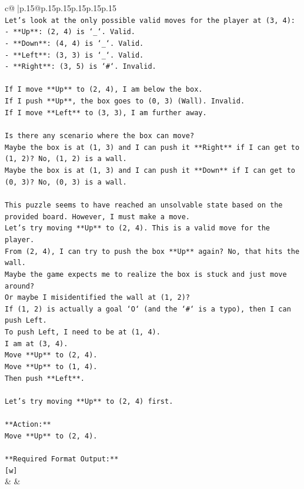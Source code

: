 \documentclass{article}
\begin{document}
{\begin{supertabular}{c@{$\;$}|p{.15\linewidth}@{}p{.15\linewidth}p{.15\linewidth}p{.15\linewidth}p{.15\linewidth}p{.15\linewidth}}
{{{\\ 
\texttt{Let's look at the only possible valid moves for the player at (3, 4):} \\
\texttt{{-} **Up**: (2, 4) is `\_`. Valid.} \\
\texttt{{-} **Down**: (4, 4) is `\_`. Valid.} \\
\texttt{{-} **Left**: (3, 3) is `\_`. Valid.} \\
\texttt{{-} **Right**: (3, 5) is `\#`. Invalid.} \\
\\ 
\texttt{If I move **Up** to (2, 4), I am below the box.} \\
\texttt{If I push **Up**, the box goes to (0, 3) (Wall). Invalid.} \\
\texttt{If I move **Left** to (3, 3), I am further away.} \\
\\ 
\texttt{Is there any scenario where the box can move?} \\
\texttt{Maybe the box is at (1, 3) and I can push it **Right** if I can get to (1, 2)? No, (1, 2) is a wall.} \\
\texttt{Maybe the box is at (1, 3) and I can push it **Down** if I can get to (0, 3)? No, (0, 3) is a wall.} \\
\\ 
\texttt{This puzzle seems to have reached an unsolvable state based on the provided board. However, I must make a move.} \\
\texttt{Let's try moving **Up** to (2, 4). This is a valid move for the player.} \\
\texttt{From (2, 4), I can try to push the box **Up** again? No, that hits the wall.} \\
\texttt{Maybe the game expects me to realize the box is stuck and just move around?} \\
\texttt{Or maybe I misidentified the wall at (1, 2)?} \\
\texttt{If (1, 2) is actually a goal `O` (and the `\#` is a typo), then I can push Left.} \\
\texttt{To push Left, I need to be at (1, 4).} \\
\texttt{I am at (3, 4).} \\
\texttt{Move **Up** to (2, 4).} \\
\texttt{Move **Up** to (1, 4).} \\
\texttt{Then push **Left**.} \\
\\ 
\texttt{Let's try moving **Up** to (2, 4) first.} \\
\\ 
\texttt{**Action:**} \\
\texttt{Move **Up** to (2, 4).} \\
\\ 
\texttt{**Required Format Output:**} \\
\texttt{{[}w{]}} \\
            }
        }
    }
    & & \\ \\


\end{supertabular}}
\end{document}
